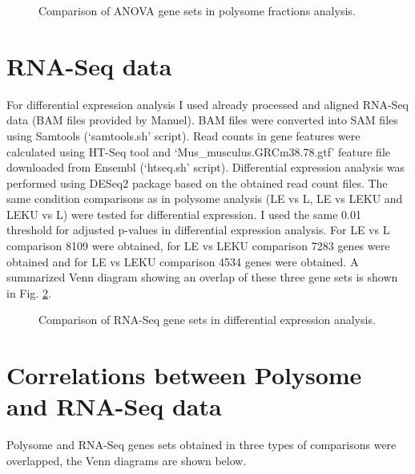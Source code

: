 \documentclass[12pt]{article} %
\begin{document}
\begin{figure}[H] %
\caption{Comparison of ANOVA gene sets in polysome fractions analysis.}
\label{fig:venn-polysome}
\end{figure}



\section{RNA-Seq data} %
For differential expression analysis I used already processed and aligned RNA-Seq data (BAM files provided by Manuel). BAM files were converted into SAM files using Samtools (`samtools.sh' script). Read counts in gene features were calculated using HT-Seq tool and `Mus\_musculus.GRCm38.78.gtf' feature file downloaded from Ensembl (`htseq.sh' script). Differential expression analysis was performed using DESeq2 package based on the obtained read count files. The same condition comparisons as in polysome analysis (LE vs L, LE vs LEKU and LEKU vs L) were tested for differential expression. I used the same 0.01 threshold for adjusted p-values in differential expression analysis. For LE vs L comparison 8109 were obtained, for LE vs LEKU comparison 7283 genes were obtained and for LE vs LEKU comparison 4534 genes were obtained. A summarized Venn diagram showing an overlap of these three gene sets is shown in Fig. \ref{fig:venn-rna-seq}.

\begin{figure}[H] %
\caption{Comparison of RNA-Seq gene sets in differential expression analysis.}
\label{fig:venn-rna-seq}
\end{figure}


\section{Correlations between Polysome and RNA-Seq data} %
Polysome and RNA-Seq genes sets obtained in three types of comparisons were overlapped, the Venn diagrams are shown below.
\end{document}
